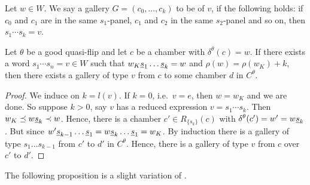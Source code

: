 \begin{defi}
	Let $w \in W$. We say a gallery $G = (c_0, \ldots, c_k)$ to be of  $v$, if the following holds: if $c_0$ and $c_1$ are in the same $s_1$-panel, $c_1$ and $c_2$ in the same $s_2$-panel and so on, then $s_1 \cdots s_k = v$.
\end{defi}

\begin{lemm}
	Let $\theta$ be a good quasi-flip and let $c$ be a chamber with $\delta^\theta(c)=w$. If there exists a word $s_1 \cdots s_n = v \in W$ such that $w_K \underline{s}_1 \ldots \underline{s}_k = w $ and $\rho(w) = \rho(w_K) + k$, then there exists a gallery of type $v$ from $c$ to some chamber $d$ in $C^\theta$.

	\begin{proof}
		We induce on $k = l(v)$. If $k = 0$, i.e.\ $v = e$, then $w = w_K$ and we are done. So suppose $k > 0$, say $v$ has a reduced expression $v = s_1 \cdots s_k$. Then $w_K \preceq w \underline{s}_k \prec w$. Hence, there is a chamber $c' \in R_{\{s_k\}}(c)$ with $\delta^\theta(c') = w' = w \underline{s}_k$. But since $w' \underline{s}_{k-1} \ldots \underline{s}_1 = w \underline{s}_k \ldots \underline{s}_1 = w_K$. By induction there is a gallery of type $s_1 \ldots s_{k-1}$ from $c'$ to $d'$ in $C^\theta$. Hence, there is a gallery of type $v$ from $c$ over $c'$ to $d'$.
	\end{proof}
\end{lemm}

The following proposition is a slight variation of \cite[Proposition 4.5.4]{horn:kac-moody}.

